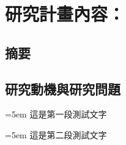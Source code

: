 \documentclass{article}
\begin{document}
\setcounter{section}{0} %
\section{研究計畫內容：}
\subsection{摘要}
\subsection{研究動機與研究問題}
\hangindent=5em  %
這是第一段測試文字
\par %
\hangindent=5em  %
這是第二段測試文字 %
\end{document}

